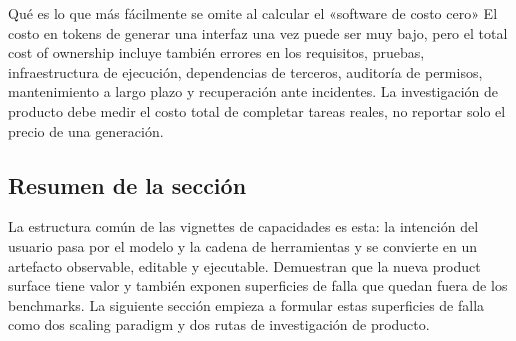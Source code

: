 
\begin{warningbox}{Qué es lo que más fácilmente se omite al calcular el «software de costo cero»}
El costo en tokens de generar una interfaz una vez puede ser muy bajo, pero el total cost of ownership incluye también errores en los requisitos, pruebas, infraestructura de ejecución, dependencias de terceros, auditoría de permisos, mantenimiento a largo plazo y recuperación ante incidentes. La investigación de producto debe medir el costo total de completar tareas reales, no reportar solo el precio de una generación.
\end{warningbox}

\subsection{Resumen de la sección}

La estructura común de las vignettes de capacidades es esta: la intención del usuario pasa por el modelo y la cadena de herramientas y se convierte en un artefacto observable, editable y ejecutable. Demuestran que la nueva product surface tiene valor y también exponen superficies de falla que quedan fuera de los benchmarks. La siguiente sección empieza a formular estas superficies de falla como dos scaling paradigm y dos rutas de investigación de producto.
